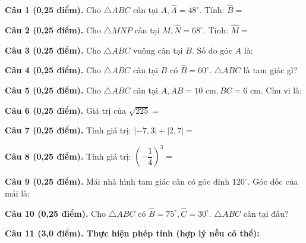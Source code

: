 \documentclass[12pt,a4paper]{article}
\begin{document}
\vspace{1.2mm}
\noindent\textbf{Câu 1 (0,25 điểm).} Cho $\triangle ABC$ cân tại $A, \widehat{A} = 48^\circ$. Tính: $\widehat{B} =$ \par\vspace{2.5mm}
\noindent\textbf{Câu 2 (0,25 điểm).} Cho $\triangle MNP$ cân tại $M, \widehat{N} = 68^\circ$. Tính: $\widehat{M} =$ \par\vspace{2.5mm}
\noindent\textbf{Câu 3 (0,25 điểm).} Cho $\triangle ABC$ vuông cân tại $B$. Số đo góc $A$ là: \par\vspace{2.5mm}
\noindent\textbf{Câu 4 (0,25 điểm).} Cho $\triangle ABC$ cân tại $B$ có $\widehat{B} = 60^\circ$. $\triangle ABC$ là tam giác gì? \par\vspace{2.5mm}
\noindent\textbf{Câu 5 (0,25 điểm).} Cho $\triangle ABC$ cân tại $A, AB = 10\text{ cm}, BC = 6\text{ cm}$. Chu vi là: \par\vspace{2.5mm}
\noindent\textbf{Câu 6 (0,25 điểm).} Giá trị của $\sqrt{225} =$ \par\vspace{2.5mm}
\noindent\textbf{Câu 7 (0,25 điểm).} Tính giá trị: $|-7{,}3| + |2{,}7| =$ \par\vspace{2.5mm}
\noindent\textbf{Câu 8 (0,25 điểm).} Tính giá trị: $\left(-\dfrac{1}{4}\right)^3 =$ \par\vspace{2.5mm}
\noindent\textbf{Câu 9 (0,25 điểm).} Mái nhà hình tam giác cân có góc đỉnh $120^\circ$. Góc dốc của mái là: \par\vspace{2.5mm}
\noindent\textbf{Câu 10 (0,25 điểm).} Cho $\triangle ABC$ có $\widehat{B} = 75^\circ, \widehat{C} = 30^\circ$. $\triangle ABC$ cân tại đâu? \par\vspace{2.5mm}
\vspace{0.2mm}
\noindent\textbf{Câu 11 (3,0 điểm). Thực hiện phép tính (hợp lý nếu có thể):}
\vspace{0.5mm}
\end{document}
